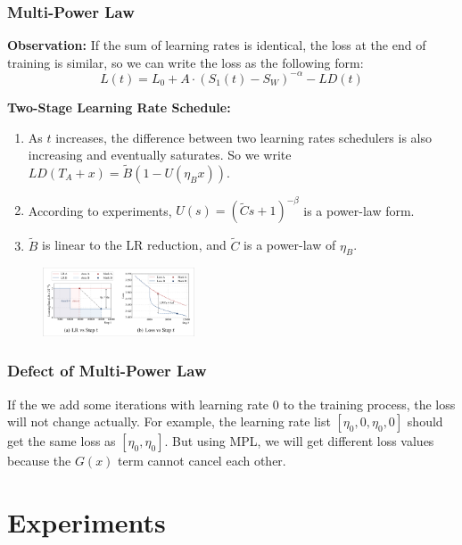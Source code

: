 \documentclass[aspectratio=169]{beamer}
\begin{document}
    \begin{frame}
        \frametitle{Multi-Power Law}
        \textbf{Observation:} If the sum of learning rates is identical, the
        loss at the end of training is similar, so we can write the loss
        as the following form:
        \begin{equation}
            L(t) = L_0 + A\cdot (S_1(t)-S_W)^{-\alpha} - LD(t)
        \end{equation}

        \textbf{Two-Stage Learning Rate Schedule:}
        \begin{enumerate}
            \item As $t$ increases, the difference between two learning
            rates schedulers is also increasing and eventually saturates.
            So we write $LD(T_A+x) = \tilde{B}(1-U(\eta_B x))$.
            \item According to experiments, $U(s) =
            (\tilde{C}s+1)^{-\beta}$ is a power-law form.
            \item $\tilde{B}$ is linear to the LR reduction, and $\tilde{C}$
            is a power-law of $\eta_B$.
        \end{enumerate}
        \begin{figure}
            \centering
            \includegraphics[width=0.4\textwidth]{fig/mpl.png}
        \end{figure}
    \end{frame}

    \begin{frame}
        \frametitle{Defect of Multi-Power Law}
        If the we add some iterations with learning rate 0
        to the training process, the loss will not change actually.
        For example, the learning rate list $[\eta_0,0,\eta_0,0]$ should
        get the same loss as $[\eta_0,\eta_0]$.
        But using MPL, we will get different loss values because
        the $G(x)$ term cannot cancel each other.
    \end{frame}


    \section{Experiments}\label{sec:experiments}
\end{document}
